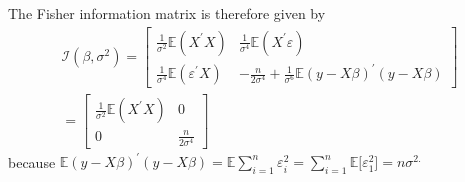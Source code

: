\documentclass[notes=show]{beamer}
\begin{document}
\begin{frame}%



The Fisher information matrix is therefore given by%
\begin{gather*}
\mathcal{I}(\beta ,\sigma ^{2})=\left[ 
\begin{array}{cc}
\frac{1}{\sigma ^{2}}\mathbb{E}\left( X^{\prime }X\right) & \frac{1}{\sigma
^{4}}\mathbb{E}(X^{\prime }\varepsilon ) \\ 
\frac{1}{\sigma ^{4}}\mathbb{E}(\varepsilon ^{\prime }X) & -\frac{n}{2\sigma
^{4}}+\frac{1}{\sigma ^{6}}\mathbb{E}(y-X\beta )^{\prime }(y-X\beta )%
\end{array}%
\right] \\
=\left[ 
\begin{array}{cc}
\frac{1}{\sigma ^{2}}\mathbb{E}\left( X^{\prime }X\right) & 0 \\ 
0 & \frac{n}{2\sigma ^{4}}%
\end{array}%
\right]
\end{gather*}%
because $\mathbb{E}(y-X\beta )^{\prime }(y-X\beta )=\mathbb{E}%
\sum_{i=1}^{n}\varepsilon _{i}^{2}=\sum_{i=1}^{n}\mathbb{E[}\varepsilon
_{1}^{2}]=n\sigma ^{2.}$

\end{frame}%
\end{document}
